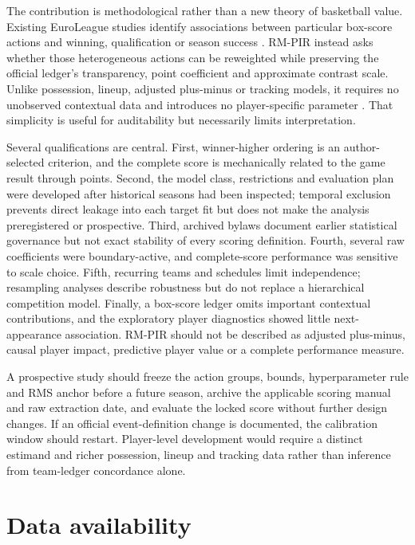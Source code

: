 \documentclass[pdflatex,sn-mathphys-num]{sn-jnl}
\begin{document}
The contribution is methodological rather than a new theory of basketball value. Existing EuroLeague studies identify associations between particular box-score actions and winning, qualification or season success \cite{Ozmen2016,Cene2018,MikolajecEtAl2021,KamitsisPolitis2025}. RM-PIR instead asks whether those heterogeneous actions can be reweighted while preserving the official ledger's transparency, point coefficient and approximate contrast scale. Unlike possession, lineup, adjusted plus-minus or tracking models, it requires no unobserved contextual data and introduces no player-specific parameter \cite{Oliver2004,CharamisEtAl2023,DeshpandeJensen2016,GhimireEtAl2020}. That simplicity is useful for auditability but necessarily limits interpretation.

Several qualifications are central. First, winner-higher ordering is an author-selected criterion, and the complete score is mechanically related to the game result through points. Second, the model class, restrictions and evaluation plan were developed after historical seasons had been inspected; temporal exclusion prevents direct leakage into each target fit but does not make the analysis preregistered or prospective. Third, archived bylaws document earlier statistical governance but not exact stability of every scoring definition. Fourth, several raw coefficients were boundary-active, and complete-score performance was sensitive to scale choice. Fifth, recurring teams and schedules limit independence; resampling analyses describe robustness but do not replace a hierarchical competition model. Finally, a box-score ledger omits important contextual contributions, and the exploratory player diagnostics showed little next-appearance association. RM-PIR should not be described as adjusted plus-minus, causal player impact, predictive player value or a complete performance measure.

A prospective study should freeze the action groups, bounds, hyperparameter rule and RMS anchor before a future season, archive the applicable scoring manual and raw extraction date, and evaluate the locked score without further design changes. If an official event-definition change is documented, the calibration window should restart. Player-level development would require a distinct estimand and richer possession, lineup and tracking data rather than inference from team-ledger concordance alone.

\section{Data availability}
\end{document}

